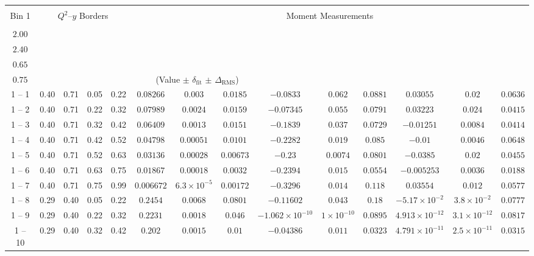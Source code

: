 \begin{longtable}{|*{14}{c|}}
\hline
\endfoot
\hline
\endlastfoot
\hline
\multirow{2}{*}{\makecell{$Q^{2}$--$y$\\Bin 1}} & \multicolumn{4}{c|}{$Q^{2}$--$y$ Borders} & \multicolumn{9}{c|}{Moment Measurements} \\
 & \makecell{$Q^{2}_{\min}$\\$2.00$} & \makecell{$Q^{2}_{\max}$\\$2.40$} & \makecell{$y_{\min}$\\$0.65$} & \makecell{$y_{\max}$\\$0.75$} & \multicolumn{9}{c|}{(Value $\pm$ $\delta_{\mathrm{fit}}$ $\pm$ $\Delta_{\mathrm{RMS}}$)} \\
\hline
1 -- 1 & 0.40 & 0.71 & 0.05 & 0.22 & $0.08266$ & $0.003$ & $0.0185$ & $-0.0833$ & $0.062$ & $0.0881$ & $0.03055$ & $0.02$ & $0.0636$ \\
\hline
1 -- 2 & 0.40 & 0.71 & 0.22 & 0.32 & $0.07989$ & $0.0024$ & $0.0159$ & $-0.07345$ & $0.055$ & $0.0791$ & $0.03223$ & $0.024$ & $0.0415$ \\
\hline
1 -- 3 & 0.40 & 0.71 & 0.32 & 0.42 & $0.06409$ & $0.0013$ & $0.0151$ & $-0.1839$ & $0.037$ & $0.0729$ & $-0.01251$ & $0.0084$ & $0.0414$ \\
\hline
1 -- 4 & 0.40 & 0.71 & 0.42 & 0.52 & $0.04798$ & $0.00051$ & $0.0101$ & $-0.2282$ & $0.019$ & $0.085$ & $-0.01$ & $0.0046$ & $0.0648$ \\
\hline
1 -- 5 & 0.40 & 0.71 & 0.52 & 0.63 & $0.03136$ & $0.00028$ & $0.00673$ & $-0.23$ & $0.0074$ & $0.0801$ & $-0.0385$ & $0.02$ & $0.0455$ \\
\hline
1 -- 6 & 0.40 & 0.71 & 0.63 & 0.75 & $0.01867$ & $0.00018$ & $0.0032$ & $-0.2394$ & $0.015$ & $0.0554$ & $-0.005253$ & $0.0036$ & $0.0188$ \\
\hline
1 -- 7 & 0.40 & 0.71 & 0.75 & 0.99 & $0.006672$ & $6.3\times 10^{-5}$ & $0.00172$ & $-0.3296$ & $0.014$ & $0.118$ & $0.03554$ & $0.012$ & $0.0577$ \\
\hline
1 -- 8 & 0.29 & 0.40 & 0.05 & 0.22 & $0.2454$ & $0.0068$ & $0.0801$ & $-0.11602$ & $0.043$ & $0.18$ & $-5.17\times 10^{-2}$ & $3.8\times 10^{-2}$ & $0.0777$ \\
\hline
1 -- 9 & 0.29 & 0.40 & 0.22 & 0.32 & $0.2231$ & $0.0018$ & $0.046$ & $-1.062\times 10^{-10}$ & $1\times 10^{-10}$ & $0.0895$ & $4.913\times 10^{-12}$ & $3.1\times 10^{-12}$ & $0.0817$ \\
\hline
1 -- 10 & 0.29 & 0.40 & 0.32 & 0.42 & $0.202$ & $0.0015$ & $0.01$ & $-0.04386$ & $0.011$ & $0.0323$ & $4.791\times 10^{-11}$ & $2.5\times 10^{-11}$ & $0.0315$ \\

\end{longtable}

